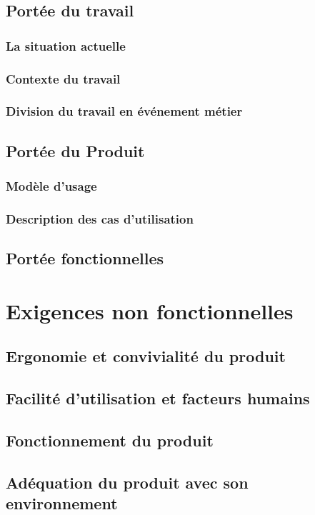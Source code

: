 \documentclass[a4paper, 12pt, french]{report}
\begin{document}
		\section{Portée du travail}
			\subsection{La situation actuelle}
				

			\subsection{Contexte du travail}
			\subsection{Division du travail en événement métier}
				
		\section{Portée du Produit}
			\subsection{Modèle d'usage}
			\subsection{Description des cas d'utilisation}

		\section{Portée fonctionnelles}

	\chapter{Exigences non fonctionnelles}
		\section{Ergonomie et convivialité du produit}
			

		\section{Facilité d'utilisation et facteurs humains}
			

		\section{Fonctionnement du produit}
			
		\section{Adéquation du produit avec son environnement}
			
\end{document}
